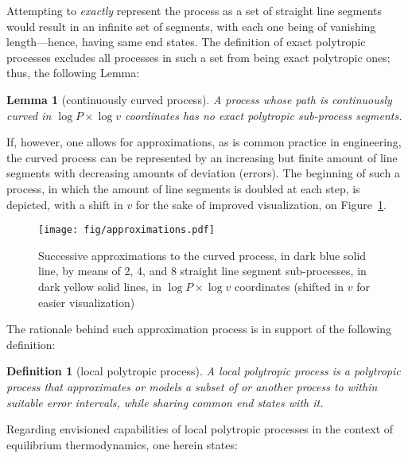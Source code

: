 \documentclass[fleqn,11pt]{SelfArx}
\newtheorem{definition}{Definition}
\newtheorem{lemma}{Lemma}
\begin{document}
    Attempting to \emph{exactly} represent the process as a set of straight line segments  would
    result in an infinite set of segments, with each  one  being  of  vanishing  length---hence,
    having same end states. The definition of exact polytropic processes excludes all  processes
    in such a set from being exact polytropic ones; thus, the following Lemma:

    \begin{lemma}[continuously curved process]\label{lemm:curved.proc}
        A process whose path is continuously curved in $\log P \times \log v$ coordinates has no
        exact polytropic sub-process segments.
    \end{lemma}

    If, however, one allows for approximations, as is common practice in engineering, the curved
    process can be represented by  an  increasing  but  finite  amount  of  line  segments  with
    decreasing amounts of deviation (errors). The beginning of such  a  process,  in  which  the
    amount of line segments is doubled at each step, is depicted, with a shift in  $v$  for  the
    sake of improved visualization, on Figure~\ref{fig:approx}.

    \begin{figure}[ht]
        \centering
        \texttt{[image: fig/approximations.pdf]}
        \caption{Successive approximations to the curved process, in dark blue  solid  line,  by
            means of 2, 4, and 8 straight line  segment  sub-processes,  in  dark  yellow  solid
            lines,  in  $\log  P  \times  \log  v$  coordinates  (shifted  in  $v$  for   easier
            visualization)}
        \label{fig:approx}
    \end{figure}

    The rationale behind such approximation process is in support of the following definition:

    \begin{definition}[local polytropic process]\label{def:local.polytropic}
        A local polytropic process is a polytropic process that approximates or models a  subset
        of or another process to within suitable  error  intervals,  while  sharing  common  end
        states with it.
    \end{definition}

    Regarding  envisioned  capabilities  of  local  polytropic  processes  in  the  context   of
    equilibrium thermodynamics, one herein states:
\end{document}
